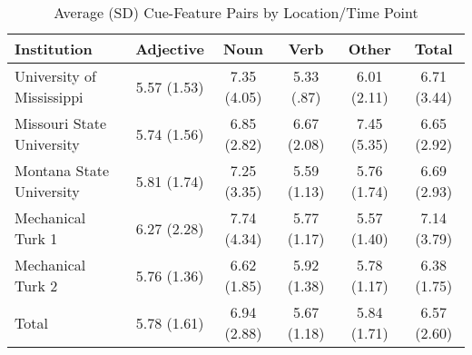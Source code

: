\documentclass[english,man]{apa6}
\theoremstyle{definition}
\theoremstyle{definition}
\theoremstyle{definition}
\theoremstyle{remark}
\begin{document}
\begin{table}[tbp]
\begin{center}
\begin{threeparttable}
\caption{\label{tab:feature-table}Average (SD) Cue-Feature Pairs by Location/Time Point}
\begin{tabular}{lccccc}
\toprule
Institution & Adjective & Noun & Verb & Other & Total\\
\midrule
University of Mississippi & 5.57 (1.53) & 7.35 (4.05) & 5.33 (.87) & 6.01 (2.11) & 6.71 (3.44)\\
Missouri State University & 5.74 (1.56) & 6.85 (2.82) & 6.67 (2.08) & 7.45 (5.35) & 6.65 (2.92)\\
Montana State University & 5.81 (1.74) & 7.25 (3.35) & 5.59 (1.13) & 5.76 (1.74) & 6.69 (2.93)\\
Mechanical Turk 1 & 6.27 (2.28) & 7.74 (4.34) & 5.77 (1.17) & 5.57 (1.40) & 7.14 (3.79)\\
Mechanical Turk 2 & 5.76 (1.36) & 6.62 (1.85) & 5.92 (1.38) & 5.78 (1.17) & 6.38 (1.75)\\
Total & 5.78 (1.61) & 6.94 (2.88) & 5.67 (1.18) & 5.84 (1.71) & 6.57 (2.60)\\
\bottomrule
\end{tabular}
\end{threeparttable}
\end{center}
\end{table}
\end{document}
